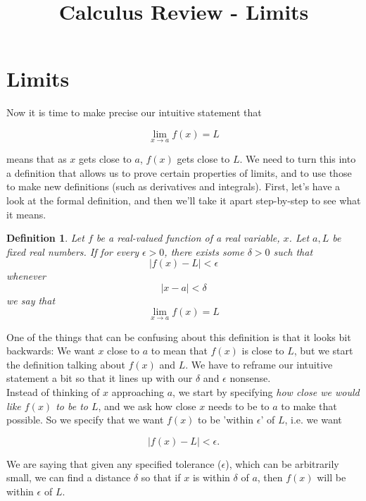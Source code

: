 \documentclass[12pt,a4paper]{article} %
\title{Calculus Review - Limits}
\newtheorem{defn}{Definition}
\begin{document}
\maketitle

\section{Limits} 
Now it is time to make precise our intuitive statement that 

$$\lim\limits_{x\rightarrow a} f(x) = L$$

means that as $x$ gets close to $a$, $f(x)$ gets close to $L$. We need to turn this into a definition that allows us to prove certain properties of limits, and to use those to make new definitions (such as derivatives and integrals). First, let's have a look at the formal definition, and then we'll take it apart step-by-step to see what it means.

\begin{defn}
Let $f$ be a real-valued function of a real variable, $x$.  Let $a,L$ be fixed real numbers.  If for every $\epsilon >0$, there exists some $\delta>0$ such that
\begin{equation*}
|f(x) - L|<\epsilon 
\end{equation*}
whenever
\begin{equation*}
|x - a|<\delta 
\end{equation*}
we say that
\begin{equation*}
\lim_{x\rightarrow a} f(x) = L
\end{equation*}
\end{defn}
 One of the things that can be confusing about this definition is that it looks bit backwards: We want $x$ close to $a$ to mean that $f(x)$ is close to $L$, but we start the definition talking about $f(x)$ and $L$. We have to reframe our intuitive statement a bit so that it lines up with our $\delta$ and $\epsilon$ nonsense.\\
 
Instead of thinking of $x$ approaching $a$, we start by specifying \emph{how close we would like $f(x)$ to be to $L$}, and we ask how close $x$ needs to be to $a$ to make that possible. So we specify that we want $f(x)$ to be 'within $\epsilon$' of $L$, i.e. we want 

$$|f(x) - L| < \epsilon.$$
 
We are saying that given any specified tolerance ($\epsilon$), which can be arbitrarily small, we can find a distance $\delta$ so that if $x$ is within $\delta$ of $a$, then $f(x)$ will be within $\epsilon$ of $L$. 
\end{document}
